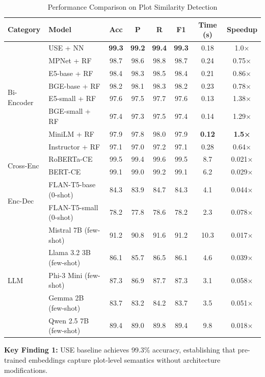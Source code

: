 \documentclass[11pt,a4paper]{article}
\begin{document}
\begin{table}[t]
\centering
\small
\caption{Performance Comparison on Plot Similarity Detection}
\label{tab:main_results}
\begin{tabular}{llcccccc}
\toprule
\textbf{Category} & \textbf{Model} & \textbf{Acc} & \textbf{P} & \textbf{R} & \textbf{F1} & \textbf{Time (s)} & \textbf{Speedup} \\
\midrule
\multirow{8}{*}{Bi-Encoder}
  & USE + NN & \textbf{99.3} & \textbf{99.2} & \textbf{99.4} & \textbf{99.3} & 0.18 & 1.0× \\
  & MPNet + RF & 98.7 & 98.6 & 98.8 & 98.7 & 0.24 & 0.75× \\
  & E5-base + RF & 98.4 & 98.3 & 98.5 & 98.4 & 0.21 & 0.86× \\
  & BGE-base + RF & 98.2 & 98.1 & 98.3 & 98.2 & 0.23 & 0.78× \\
  & E5-small + RF & 97.6 & 97.5 & 97.7 & 97.6 & 0.13 & 1.38× \\
  & BGE-small + RF & 97.4 & 97.3 & 97.5 & 97.4 & 0.14 & 1.29× \\
  & MiniLM + RF & 97.9 & 97.8 & 98.0 & 97.9 & \textbf{0.12} & \textbf{1.5×} \\
  & Instructor + RF & 97.1 & 97.0 & 97.2 & 97.1 & 0.28 & 0.64× \\
\midrule
\multirow{2}{*}{Cross-Enc}
  & RoBERTa-CE & 99.5 & 99.4 & 99.6 & 99.5 & 8.7 & 0.021× \\
  & BERT-CE & 99.1 & 99.0 & 99.2 & 99.1 & 6.2 & 0.029× \\
\midrule
\multirow{2}{*}{Enc-Dec}
  & FLAN-T5-base (0-shot) & 84.3 & 83.9 & 84.7 & 84.3 & 4.1 & 0.044× \\
  & FLAN-T5-small (0-shot) & 78.2 & 77.8 & 78.6 & 78.2 & 2.3 & 0.078× \\
\midrule
\multirow{5}{*}{LLM}
  & Mistral 7B (few-shot) & 91.2 & 90.8 & 91.6 & 91.2 & 10.3 & 0.017× \\
  & Llama 3.2 3B (few-shot) & 86.1 & 85.7 & 86.5 & 86.1 & 4.6 & 0.039× \\
  & Phi-3 Mini (few-shot) & 87.3 & 86.9 & 87.7 & 87.3 & 3.1 & 0.058× \\
  & Gemma 2B (few-shot) & 83.7 & 83.2 & 84.2 & 83.7 & 3.5 & 0.051× \\
  & Qwen 2.5 7B (few-shot) & 89.4 & 89.0 & 89.8 & 89.4 & 9.8 & 0.018× \\
\bottomrule
\end{tabular}
\end{table}

\textbf{Key Finding 1:} USE baseline achieves 99.3\% accuracy, establishing that pre-trained embeddings capture plot-level semantics without architecture modifications.
\end{document}
